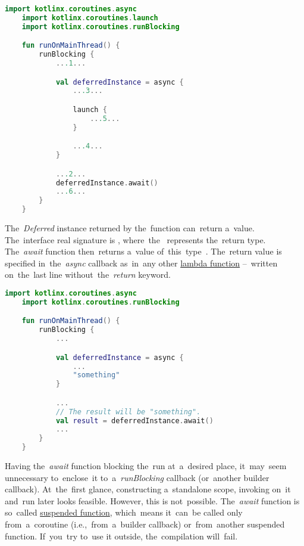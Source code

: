 \begin{lstlisting}[language=Kotlin, title={Numbers represent the~order of~execution}]
    import kotlinx.coroutines.async
    import kotlinx.coroutines.launch
    import kotlinx.coroutines.runBlocking

    fun runOnMainThread() {
        runBlocking {
            ...1...

            val deferredInstance = async {
                ...3...

                launch {
                    ...5...
                }

                ...4...
            }

            ...2...
            deferredInstance.await()
            ...6...
        }
    }
\end{lstlisting}
\newline

\noindent \mbox{The \textit{Deferred}} instance returned by the~function  can~return a~value.
The~interface real signature is , \mbox{where the } represents the~return type.
\mbox{The \textit{await}} function then~returns a~value \mbox{of this type }.
The~return value is specified \mbox{in the \textit{async}} callback as~in~any other \hyperref[kotlinlambda]{lambda function} --~written on~the~last line \mbox{without the \textit{return}} keyword.

\begin{lstlisting}[language=Kotlin]
    import kotlinx.coroutines.async
    import kotlinx.coroutines.runBlocking

    fun runOnMainThread() {
        runBlocking {
            ...

            val deferredInstance = async {
                ...
                "something"
            }

            ...
            // The result will be "something".
            val result = deferredInstance.await()
            ...
        }
    }
\end{lstlisting}
\newline

\warning Having \mbox{the \textit{await}} function blocking the~run at~a~desired place, it~may~seem unnecessary to~enclose~it \mbox{to a \textit{runBlocking}} callback (or~another builder callback).
At~the~first glance, constructing a~standalone scope, invoking  on~it and~run  later looks feasible.
However, this is not~possible.
\mbox{The \textit{await}} function is so~called \hyperref[kotlinsuspendfunction]{suspended function}, which~means it~can~be called only from~a~coroutine (i.e.,~from~a~builder callback) or~from~another suspended function.
If~you~try to~use it outside, the~compilation will~fail.

